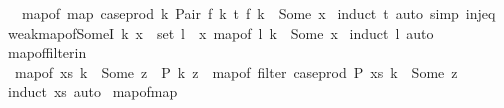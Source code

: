 \begin{isabellebody}
\ \ \ map{\isacharunderscore}{\kern0pt}of\ {\isacharparenleft}{\kern0pt}map\ {\isacharparenleft}{\kern0pt}case{\isacharunderscore}{\kern0pt}prod\ {\isacharparenleft}{\kern0pt}{\isasymlambda}k{\isachardot}{\kern0pt}\ Pair\ {\isacharparenleft}{\kern0pt}f\ k{\isacharparenright}{\kern0pt}{\isacharparenright}{\kern0pt}{\isacharparenright}{\kern0pt}\ t{\isacharparenright}{\kern0pt}\ {\isacharparenleft}{\kern0pt}f\ k{\isacharparenright}{\kern0pt}\ {\isacharequal}{\kern0pt}\ Some\ x{\isachardoublequoteclose}\isanewline
%
\isadelimproof
%
\endisadelimproof
%
\isatagproof
{}\isamarkupfalse%
\ {\isacharparenleft}{\kern0pt}induct\ t{\isacharparenright}{\kern0pt}\ {\isacharparenleft}{\kern0pt}auto\ simp{\isacharcolon}{\kern0pt}\ inj{\isacharunderscore}{\kern0pt}eq{\isacharparenright}{\kern0pt}%
\endisatagproof
{\isafoldproof}%
%
\isadelimproof
\isanewline
%
\endisadelimproof
\isanewline
{}\isamarkupfalse%
\ weak{\isacharunderscore}{\kern0pt}map{\isacharunderscore}{\kern0pt}of{\isacharunderscore}{\kern0pt}SomeI{\isacharcolon}{\kern0pt}\ {\isachardoublequoteopen}{\isacharparenleft}{\kern0pt}k{\isacharcomma}{\kern0pt}\ x{\isacharparenright}{\kern0pt}\ {\isasymin}\ set\ l\ {\isasymLongrightarrow}\ {\isasymexists}x{\isachardot}{\kern0pt}\ map{\isacharunderscore}{\kern0pt}of\ l\ k\ {\isacharequal}{\kern0pt}\ Some\ x{\isachardoublequoteclose}\isanewline
%
\isadelimproof
%
\endisadelimproof
%
\isatagproof
{}\isamarkupfalse%
\ {\isacharparenleft}{\kern0pt}induct\ l{\isacharparenright}{\kern0pt}\ auto%
\endisatagproof
{\isafoldproof}%
%
\isadelimproof
\isanewline
%
\endisadelimproof
\isanewline
{}\isamarkupfalse%
\ map{\isacharunderscore}{\kern0pt}of{\isacharunderscore}{\kern0pt}filter{\isacharunderscore}{\kern0pt}in{\isacharcolon}{\kern0pt}\isanewline
\ \ {\isachardoublequoteopen}map{\isacharunderscore}{\kern0pt}of\ xs\ k\ {\isacharequal}{\kern0pt}\ Some\ z\ {\isasymLongrightarrow}\ P\ k\ z\ {\isasymLongrightarrow}\ map{\isacharunderscore}{\kern0pt}of\ {\isacharparenleft}{\kern0pt}filter\ {\isacharparenleft}{\kern0pt}case{\isacharunderscore}{\kern0pt}prod\ P{\isacharparenright}{\kern0pt}\ xs{\isacharparenright}{\kern0pt}\ k\ {\isacharequal}{\kern0pt}\ Some\ z{\isachardoublequoteclose}\isanewline
%
\isadelimproof
%
\endisadelimproof
%
\isatagproof
{}\isamarkupfalse%
\ {\isacharparenleft}{\kern0pt}induct\ xs{\isacharparenright}{\kern0pt}\ auto%
\endisatagproof
{\isafoldproof}%
%
\isadelimproof
\isanewline
%
\endisadelimproof
\isanewline
{}\isamarkupfalse%
\ map{\isacharunderscore}{\kern0pt}of{\isacharunderscore}{\kern0pt}map{\isacharcolon}{\kern0pt}\isanewline

\end{isabellebody}
